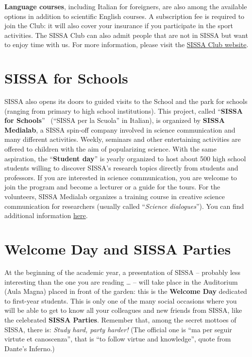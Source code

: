 \documentclass{sissavademecum}
\begin{document}
\textbf{Language courses}, including Italian for foreigners, are also among the available options in addition to scientific English courses. A subscription fee is required to join the Club: it will also cover your insurance if you participate in the sport activities. The SISSA Club can also admit people that are not in SISSA but want to enjoy time with us. For more information, please visit the \href{http://club.sissa.it/}{SISSA Club website}. 


\section{SISSA for Schools}

SISSA also opens its doors to guided visits to the School and the park for schools (ranging from primary to high school institutions). This project, called ``\textbf{SISSA for Schools}{}'' \ (``SISSA per la Scuola'' in Italian), is organized by \textbf{SISSA Medialab}, a SISSA spin-off company involved in science communication and many different activities. Weekly, seminars and other entertaining activities are offered to children with the aim of popularizing science. With the same aspiration, the ``\textbf{Student day}'' is yearly organized to host about 500 high school students willing to discover SISSA's research topics directly from students and professors. If you are interested in science communication, you are welcome to join the program and become a lecturer or a guide for the tours.  For the volunteers, SISSA Medialab organizes a training course in creative science communication for researchers (usually called ``\textit{Science dialogues}''). You can find additional information \href{http://medialab.sissa.it/sissaperlascuola/en}{here}.


\section{Welcome Day and SISSA Parties}

At the beginning of the academic year, a presentation of SISSA -- probably less interesting than the one you are reading {\dots} -- will take place in the Auditorium (Aula Magna) placed in front of the garden: this is the \textbf{Welcome Day} dedicated to first-year students. This is only one of the many social occasions where you will be able to get to know all your colleagues and new friends from SISSA, like the celebrated \textbf{SISSA Parties}. Remember that, among the secret mottoes of SISSA, there is: \textit{Study hard, party harder!} (The official one is ``ma per seguir virtute et canoscenza'', that is ``to follow virtue and knowledge'', quote from Dante's Inferno.) 
\end{document}
